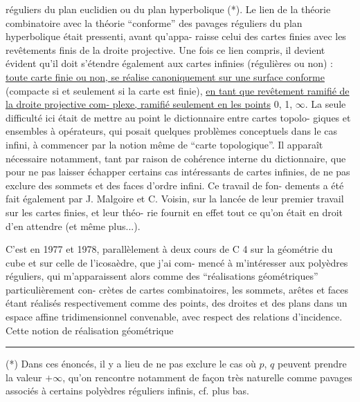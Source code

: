 
réguliers du plan euclidien ou du plan hyperbolique (*). Le lien
de la théorie combinatoire avec la théorie ``conforme'' des pavages
réguliers du plan hyperbolique était pressenti, avant qu'appa-%
raisse celui des cartes finies avec les revêtements finis de la
droite projective. Une fois ce lien compris, il devient évident
qu'il doit s'étendre également aux cartes infinies (régulières
ou non) : \uline{toute carte finie ou non, se réalise canoniquement sur
une surface conforme} (compacte si et seulement si la carte est
finie), \uline{en tant que revêtement ramifié de la droite projective com-%
plexe, ramifié seulement en les points} 0, 1, $\infty$. La seule difficulté
ici était de mettre au point le dictionnaire entre cartes topolo-%
giques et ensembles à opérateurs, qui posait quelques problèmes
conceptuels dans le cas infini, à commencer par la notion même de
``carte topologique''. Il apparaît nécessaire notamment, tant par
raison de cohérence interne du dictionnaire, que pour ne pas laisser
échapper certains cas intéressants de cartes infinies, de ne pas
exclure des sommets et des faces d'ordre infini. Ce travail de fon-%
dements a été fait également par J. Malgoire et C. Voisin, sur la
lancée de leur premier travail sur les cartes finies, et leur théo-%
rie fournit en effet tout ce qu'on était en droit d'en attendre
(et même plus...).

C'est en 1977 et 1978, parallèlement à deux cours de C 4
sur la géométrie du cube et sur celle de l'icosaèdre, que j'ai com-%
mencé à m'intéresser aux polyèdres réguliers, qui m'apparaissent
alors comme des ``réalisations géométriques'' particulièrement con-%
crètes de cartes combinatoires, les sommets, arêtes et faces étant
réalisés respectivement comme des points, des droites et des plans
dans un espace affine tridimensionnel convenable, avec respect des
relations d'incidence. Cette notion de réalisation géométrique

\rule{4cm}{0.4pt}

(*) Dans ces énoncés, il y a lieu de ne pas exclure le cas où $p$, $q$
peuvent prendre la valeur $+\infty$, qu'on rencontre notamment de façon
très naturelle comme pavages associés à certains polyèdres réguliers
infinis, cf. plus bas.

